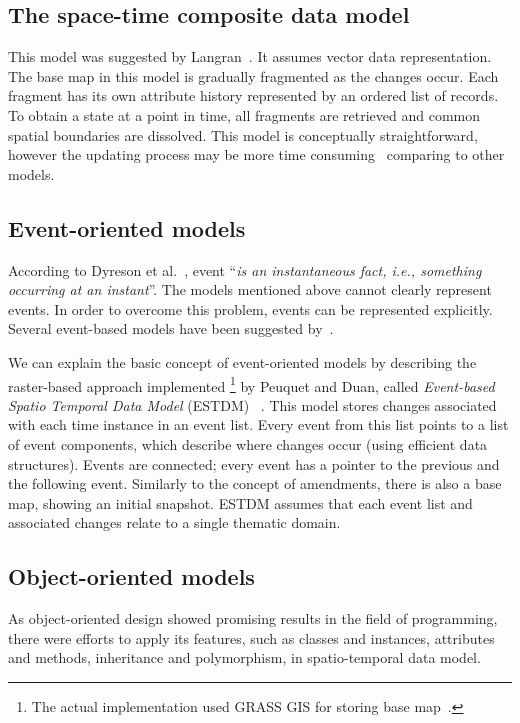 \documentclass[a4paper,12pt,oneside]{book}
\begin{document}
\subsection{The space-time composite data model}
This model was suggested by Langran~\cite{langran1988}. It assumes vector data representation.
The base map in this model is gradually fragmented as the changes occur.
Each fragment has its own attribute history represented by an ordered list of records.
To obtain a state at a point in time, all fragments are retrieved and common spatial boundaries are dissolved.
This model is conceptually straightforward, however the updating process may be more time consuming~\cite{pelekis2004}
comparing to other models.

\subsection{Event-oriented models}
According to Dyreson et al.~\cite[p.~56]{temporalGlossary}, event ``\emph{is an instantaneous fact, i.e., something occurring at an instant}''.
The models mentioned above cannot clearly represent events.
In order to overcome this problem, events can be represented explicitly.
Several event-based models have been suggested by~\cite{claramunt1995managing,peuquet1995,chen1998event}.

We can explain the basic concept of event-oriented models by describing
the raster-based approach implemented%
\footnote{The actual implementation used GRASS GIS for storing base map~\cite{peuquet1995}.}
by Peuquet and Duan, called
\emph{Event-based Spatio Temporal Data Model} (ESTDM) ~\cite{peuquet1995}.
This model stores changes associated with each time instance in an event list.
Every event from this list points to a list of event components,
which describe where changes occur (using efficient data structures).
Events are connected; every event has a pointer to the previous and the following event.
Similarly to the concept of amendments, there is also a base map, showing an initial snapshot.
ESTDM assumes that each event list and associated changes relate to a single thematic domain.

\subsection{Object-oriented models}
As object-oriented design showed promising results in the field of programming,
there were efforts to apply its features, such as classes and instances, attributes and methods,
inheritance and polymorphism, in spatio-temporal data model.
\end{document}
